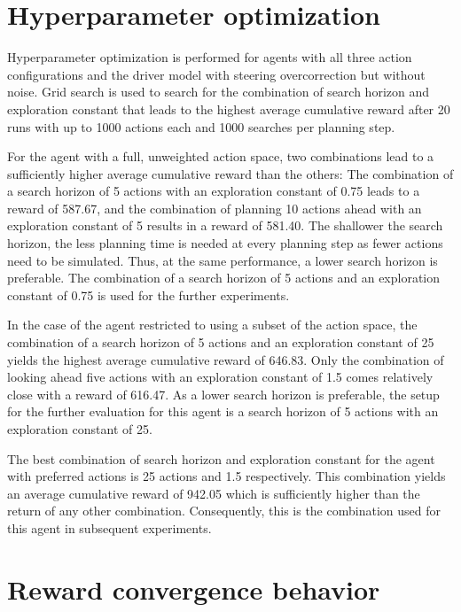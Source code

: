 

\section{Hyperparameter optimization}

Hyperparameter optimization is performed for agents with all three action configurations and the driver model with steering overcorrection but without noise. Grid search is used to search for the combination of search horizon and exploration constant that leads to the highest average cumulative reward after 20 runs with up to 1000 actions each and 1000 searches per planning step.



For the agent with a full, unweighted action space, two combinations lead to a sufficiently higher average cumulative reward than the others: The combination of a search horizon of 5 actions with an exploration constant of 0.75 leads to a reward of 587.67, and the combination of planning 10 actions ahead with an exploration constant of 5 results in a reward of 581.40. The shallower the search horizon, the less planning time is needed at every planning step as fewer actions need to be simulated. Thus, at the same performance, a lower search horizon is preferable. The combination of a search horizon of 5 actions and an exploration constant of 0.75 is used for the further experiments.

In the case of the agent restricted to using a subset of the action space, the combination of a search horizon of 5 actions and an exploration constant of 25 yields the highest average cumulative reward of 646.83. Only the combination of looking ahead five actions with an exploration constant of 1.5 comes relatively close with a reward of 616.47. As a lower search horizon is preferable, the setup for the further evaluation for this agent is a search horizon of 5 actions with an exploration constant of 25. 

The best combination of search horizon and exploration constant for the agent with preferred actions is 25 actions and 1.5 respectively. This combination yields an average cumulative reward of 942.05 which is sufficiently higher than the return of any other combination. Consequently, this is the combination used for this agent in subsequent experiments.

\section{Reward convergence behavior}

